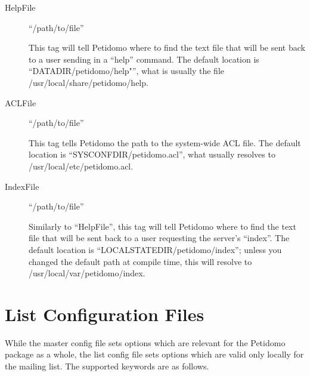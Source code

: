 \documentclass[a4paper,11pt]{scrreprt}
\newcommand{\file}[1]{{\textsf{#1}}}
\begin{document}
\begin{description}
\item[HelpFile] \hfill ``/path/to/file''

This tag will tell Petidomo where to find the text file that will be
sent back to a user sending in a ``help'' command. The default
location is ``DATADIR/petidomo/help"'', what is usually the file
\file{/usr/local/share/petidomo/help}.


\item[ACLFile] \hfill ``/path/to/file''

This tag tells Petidomo the path to the system-wide ACL file. The
default location is ``SYSCONFDIR/petidomo.acl'', what usually resolves
to \file{/usr/local/etc/petidomo.acl}.

\item[IndexFile] \hfill ``/path/to/file''

Similarly to ``HelpFile'', this tag will tell Petidomo where to find
the text file that will be sent back to a user requesting the server's
``index''. The default location is ``LOCALSTATEDIR/petidomo/index'';
unless you changed the default path at compile time, this will resolve
to \file{/usr/local/var/petidomo/index}.

\end{description}

\section{List Configuration Files}
\label{list config file}

While the master config file sets options which are relevant for the
Petidomo package as a whole, the list config file sets options which
are valid only locally for the mailing list. The supported keywords
are as follows.
\end{document}
